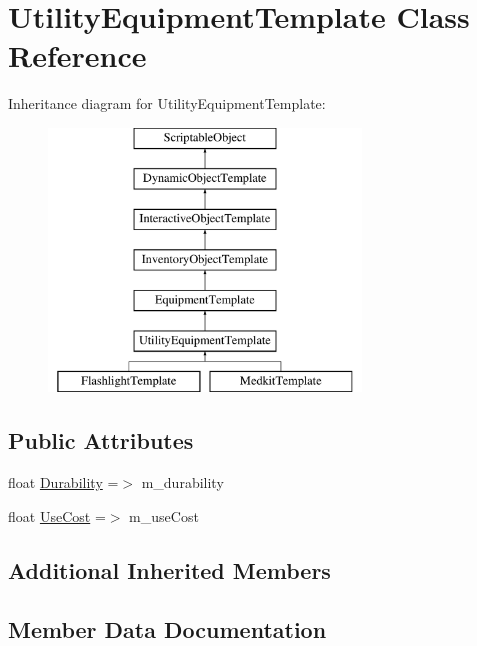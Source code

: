 \hypertarget{class_utility_equipment_template}{}\section{Utility\+Equipment\+Template Class Reference}
\label{class_utility_equipment_template}
Inheritance diagram for Utility\+Equipment\+Template\+:\begin{figure}[H]
\begin{center}
\leavevmode
\includegraphics[height=7.000000cm]{class_utility_equipment_template}
\end{center}
\end{figure}
\subsection*{Public Attributes}
\begin{DoxyCompactItemize}
\item 
float \mbox{\hyperlink{class_utility_equipment_template_a1c07e17dba6a5d24563d67aebebedf10}{Durability}} =$>$ m\+\_\+durability
\item 
float \mbox{\hyperlink{class_utility_equipment_template_af7b4e3009b9d0ae093bfdc62b04d45ea}{Use\+Cost}} =$>$ m\+\_\+use\+Cost
\end{DoxyCompactItemize}
\subsection*{Additional Inherited Members}


\subsection{Member Data Documentation}
\mbox{\label{class_utility_equipment_template_a1c07e17dba6a5d24563d67aebebedf10}} 

